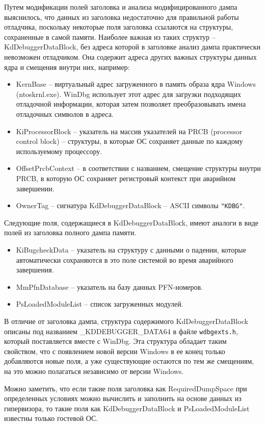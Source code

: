 \documentclass{mipt-thesis-bs}
\begin{document}
Путем модификации полей заголовка и анализа модифицированного дампа выяснилось, что данных из заголовка недостаточно для правильной работы отладчика, поскольку некоторые поля заголовка ссылаются на структуры, сохраненные в самой памяти. Наиболее важная из таких структур -- KdDebuggerDataBlock, без адреса которой в заголовке анализ дампа практически невозможен отладчиком. Она содержит адреса других важных структуры данных ядра и смещения внутри них, например:
\begin{itemize}
\item KernBase -- виртуальный адрес загруженного в память образа ядра Windows (ntoskrnl.exe). WinDbg использует этот адрес для загрузки подходящих отладочной информации, которая затем позволяет преобразовывать имена отладочных символов в адреса.
\item KiProcessorBlock -- указатель на массив указателей на PRCB (processor control block) -- структуры, в которые ОС сохраняет данные по каждому используемому процессору\cite{winternals1}.
\item OffsetPrcbContext -- в соответствии с названием, смещение структуры внутри PRCB, в которую ОС сохраняет регистровый контекст при аварийном завершении.
\item OwnerTag -- сигнатура KdDebuggerDataBlock -- ASCII символы \texttt{"KDBG"}.
\end{itemize}
Следующие поля, содержащиеся в KdDebuggerDataBloсk, имеют аналоги в виде полей из заголовка полного дампа памяти.
\begin{itemize}
\item KiBugcheckData -- указатель на структуру с данными о падении, которые автоматически сохраняются в это поле системой во время аварийного завершения.
\item MmPfnDatabase -- указатель на базу данных PFN-номеров.
\item PsLoadedModuleList -- список загруженных модулей.
\end{itemize}

В отличие от заголовка дампа, структура содержимого KdDebuggerDataBlock описаны под названием {\_}KDDEBUGGER{\_}DATA64 в файле \texttt{wdbgexts.h}, который поставляется вместе с WinDbg. Эта структура обладает таким свойством, что с появлением новой версии Windows в ее конец только добавляются новые поля, а уже существующие остаются по тем же смещениям, на это можно полагаться независимо от версии Windows.

Можно заметить, что если такие поля заголовка как RequiredDumpSpace при определенных условиях можно вычислить и заполнить на основе данных из гипервизора, то такие поля как KdDebuggerDataBlock и PsLoadedModuleList известны только гостевой ОС.
\end{document}
